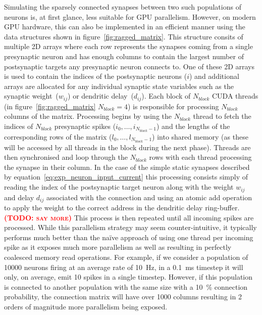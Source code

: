 \documentclass[utf8]{frontiersSCNS} %
\newcommand{\todo}[1]{\textbf{\textsc{\textcolor{red}{(TODO: #1)}}}}
\begin{document}
Simulating the sparsely connected synapses between two such populations of neurons is, at first glance, less suitable for GPU parallelism.
However, on modern GPU hardware, this can also be implemented in an efficient manner using the data structures shown in figure~\ref{fig:ragged_matrix}.
This structure consits of multiple 2D arrays where each row represents the synapses coming from a single presynaptic neuron and has enough columns to contain the largest number of postsynaptic targets any presynaptic neuron connects to.
One of these 2D arrays is used to contain the indices of the postsynaptic neurons ($i$) and additional arrays are allocated for any individual synaptic state variables such as the synaptic weight~($w_{ij}$) or dendritic delay~($d_{ij}$).
Each block of $N_{block}$ CUDA threads (in figure~\ref{fig:ragged_matrix} $N_{block}=4$) is responsible for processing $N_{block}$ columns of the matrix.
Processing begins by using the $N_{block}$ thread to fetch the indices of $N_{block}$ presynaptic spikes ($i_{0},\ldots,i_{N_{block} - 1}$) and the lengths of the corresponding rows of the matrix ($l_{0},\ldots,l_{N_{block} - 1}$) into shared memory (as these will be accessed by all threads in the block during the next phase).
Threads are then synchronised and loop through the $N_{block}$ rows with each thread processing the synapse in their column.
In the case of the simple static synapses described by equation~\ref{eq:exp_neuron_input_current} this processing consists simply of reading the index of the postsynaptic target neuron along with the weight $w_{ij}$ and delay $d_{ij}$ associated with the connection and using an atomic add operation to apply the weight to the correct address in the dendritic delay ring-buffer.\todo{say more}
This process is then repeated until all incoming spikes are processed.
While this parallelism strategy may seem counter-intuitive, it typically performs much better than the naïve approach of using one thread per incoming spike as it exposes much more parallelism as well as resulting in perfectly coalesced memory read operations.
For example, if we consider a population of \num{10000} neurons firing at an average rate of \SI{10}{\hertz}, in a \SI{0.1}{\milli\second} timestep it will only, on average, emit \num{10} spikes in a single timestep.
However, if this population is connected to another population with the same size with a \SI{10}{\percent} connection probability, the connection matrix will have over \num{1000} columns resulting in 2 orders of magnitude more parallelism being exposed.
\end{document}
